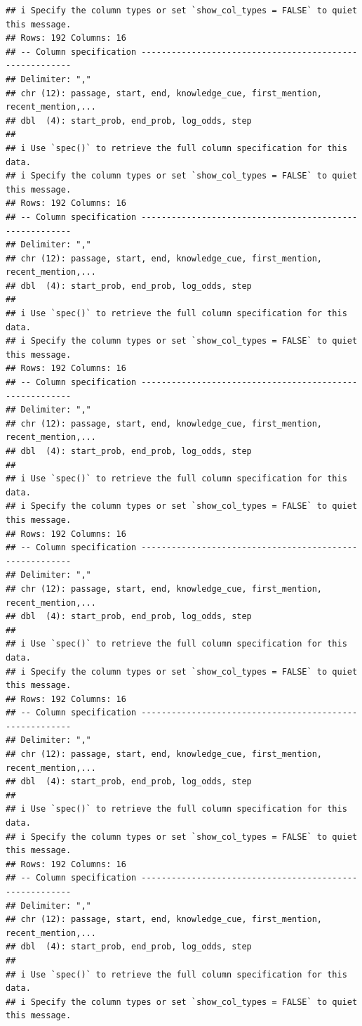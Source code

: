 \documentclass[
]{article}
\begin{document}
\begin{verbatim}
## i Specify the column types or set `show_col_types = FALSE` to quiet this message.
## Rows: 192 Columns: 16
## -- Column specification --------------------------------------------------------
## Delimiter: ","
## chr (12): passage, start, end, knowledge_cue, first_mention, recent_mention,...
## dbl  (4): start_prob, end_prob, log_odds, step
## 
## i Use `spec()` to retrieve the full column specification for this data.
## i Specify the column types or set `show_col_types = FALSE` to quiet this message.
## Rows: 192 Columns: 16
## -- Column specification --------------------------------------------------------
## Delimiter: ","
## chr (12): passage, start, end, knowledge_cue, first_mention, recent_mention,...
## dbl  (4): start_prob, end_prob, log_odds, step
## 
## i Use `spec()` to retrieve the full column specification for this data.
## i Specify the column types or set `show_col_types = FALSE` to quiet this message.
## Rows: 192 Columns: 16
## -- Column specification --------------------------------------------------------
## Delimiter: ","
## chr (12): passage, start, end, knowledge_cue, first_mention, recent_mention,...
## dbl  (4): start_prob, end_prob, log_odds, step
## 
## i Use `spec()` to retrieve the full column specification for this data.
## i Specify the column types or set `show_col_types = FALSE` to quiet this message.
## Rows: 192 Columns: 16
## -- Column specification --------------------------------------------------------
## Delimiter: ","
## chr (12): passage, start, end, knowledge_cue, first_mention, recent_mention,...
## dbl  (4): start_prob, end_prob, log_odds, step
## 
## i Use `spec()` to retrieve the full column specification for this data.
## i Specify the column types or set `show_col_types = FALSE` to quiet this message.
## Rows: 192 Columns: 16
## -- Column specification --------------------------------------------------------
## Delimiter: ","
## chr (12): passage, start, end, knowledge_cue, first_mention, recent_mention,...
## dbl  (4): start_prob, end_prob, log_odds, step
## 
## i Use `spec()` to retrieve the full column specification for this data.
## i Specify the column types or set `show_col_types = FALSE` to quiet this message.
## Rows: 192 Columns: 16
## -- Column specification --------------------------------------------------------
## Delimiter: ","
## chr (12): passage, start, end, knowledge_cue, first_mention, recent_mention,...
## dbl  (4): start_prob, end_prob, log_odds, step
## 
## i Use `spec()` to retrieve the full column specification for this data.
## i Specify the column types or set `show_col_types = FALSE` to quiet this message.

\end{verbatim}
\end{document}
